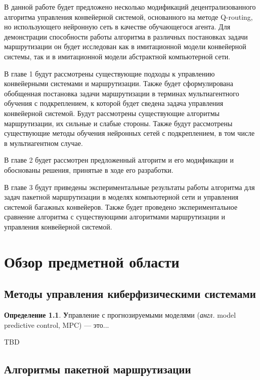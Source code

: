 \documentclass[specification,annotation,times]{itmo-student-thesis}
\theoremstyle{definition}
\newtheorem{definition-ru}{Определение}
\begin{document}
В данной работе будет предложено несколько модификаций децентрализованного
алгоритма управления конвейерной системой, основанного на методе Q-routing, но
использующего нейронную сеть в качестве обучающегося агента. Для демонстрации
способности работы алгоритма в различных постановках задачи маршрутизации он
будет исследован как в имитационной модели конвейерной системы, так и в
имитационной модели абстрактной компьютерной сети.

В главе 1 будут рассмотрены существующие подходы к управлению конвейерными
системами и маршрутизации. Также будет сформулирована обобщенная постановка
задачи маршрутизации в терминах мультиагентного обучения с подкреплением, к
которой будет сведена задача управления конвейерной системой. Будут рассмотрены
существующие алгоритмы маршрутизации, их сильные и слабые стороны. Также будут
рассмотрены существующие методы обучения нейронных сетей с подкреплением, в том
числе в мультиагентном случае.

В главе 2 будет рассмотрен предложенный алгоритм и его модификации и обоснованы
решения, принятые в ходе его разработки.

В главе 3 будут приведены экспериментальные результаты работы алгоритма для
задач пакетной маршрутизации в моделях компьютерной сети и управления системой багажных
конвейеров. Также будет проведено экспериментальное сравнение алгоритма с
существующими алгоритмами маршрутизации и управления конвейерной системой.

\chapter{Обзор предметной области}

\startrelatedwork

\section{Методы управления киберфизическими системами}

\begin{definition-ru}
  \textbf Управление с прогнозируемыми моделями (\textit{англ.} model predictive
  control, MPC) --- это...
\end{definition-ru}

TBD

\section{Алгоритмы пакетной маршрутизации}
\end{document}
